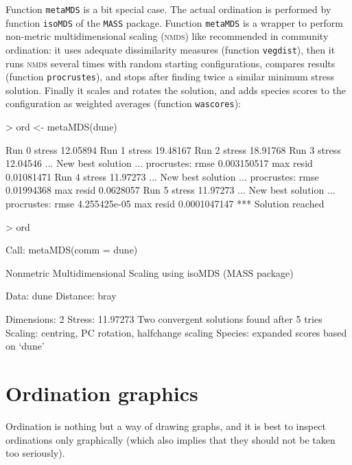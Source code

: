 \documentclass[a4paper,10pt]{amsart}
\begin{document}
Function \texttt{metaMDS} is a bit special case.  The actual
ordination is performed by function \texttt{isoMDS} of the \texttt{MASS}
package.  Function \texttt{metaMDS} is a wrapper to perform non-metric
multidimensional scaling (\textsc{nmds}) like recommended in community
ordination: it uses adequate dissimilarity measures (function
\texttt{vegdist}), then it runs \textsc{nmds} several times with
random starting configurations, compares results (function
\texttt{procrustes}), and stops after finding twice a similar minimum stress
solution.  Finally it scales and rotates the solution, and adds
species scores to the configuration as weighted averages (function
\texttt{wascores}):
\begin{Schunk}
\begin{Sinput}
> ord <- metaMDS(dune)
\end{Sinput}
\begin{Soutput}
Run 0 stress 12.05894 
Run 1 stress 19.48167 
Run 2 stress 18.91768 
Run 3 stress 12.04546 
... New best solution
... procrustes: rmse 0.003150517  max resid 0.01081471 
Run 4 stress 11.97273 
... New best solution
... procrustes: rmse 0.01994368  max resid 0.0628057 
Run 5 stress 11.97273 
... New best solution
... procrustes: rmse 4.255425e-05  max resid 0.0001047147 
*** Solution reached
\end{Soutput}
\begin{Sinput}
> ord
\end{Sinput}
\begin{Soutput}
Call:
metaMDS(comm = dune) 

Nonmetric Multidimensional Scaling using isoMDS (MASS package)

Data:     dune 
Distance: bray 

Dimensions: 2 
Stress:     11.97273 
Two convergent solutions found after 5 tries
Scaling: centring, PC rotation, halfchange scaling 
Species: expanded scores based on ‘dune’ 
\end{Soutput}
\end{Schunk}

\section{Ordination graphics}

Ordination is nothing but a way of drawing graphs, and it is best to
inspect ordinations only graphically (which also implies that they
should not be taken too seriously).
\end{document}
